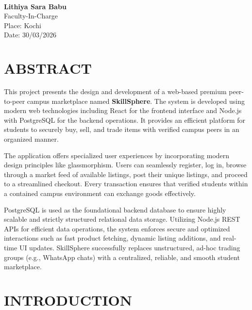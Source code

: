 \documentclass[a4paper,12pt]{report}
\begin{document}
\textbf{\\Lithiya Sara Babu}\\
Faculty-In-Charge
\vspace{3cm}
\\
Place: Kochi\\
Date: 30/03/2026

\newpage


\tableofcontents
\newpage

\chapter{ABSTRACT}

This project presents the design and development of a web-based premium peer-to-peer campus marketplace named \textbf{SkillSphere}. The system is developed using modern web technologies including React for the frontend interface and Node.js with PostgreSQL for the backend operations. It provides an efficient platform for students to securely buy, sell, and trade items with verified campus peers in an organized manner.

\vspace{0.3cm}

The application offers specialized user experiences by incorporating modern design principles like glassmorphism. Users can seamlessly register, log in, browse through a market feed of available listings, post their unique listings, and proceed to a streamlined checkout. Every transaction ensures that verified students within a contained campus environment can exchange goods effectively.

\vspace{0.3cm}

PostgreSQL is used as the foundational backend database to ensure highly scalable and strictly structured relational data storage. Utilizing Node.js REST APIs for efficient data operations, the system enforces secure and optimized interactions such as fast product fetching, dynamic listing additions, and real-time UI updates. SkillSphere successfully replaces unstructured, ad-hoc trading groups (e.g., WhatsApp chats) with a centralized, reliable, and smooth student marketplace.

\chapter{INTRODUCTION}
\end{document}

